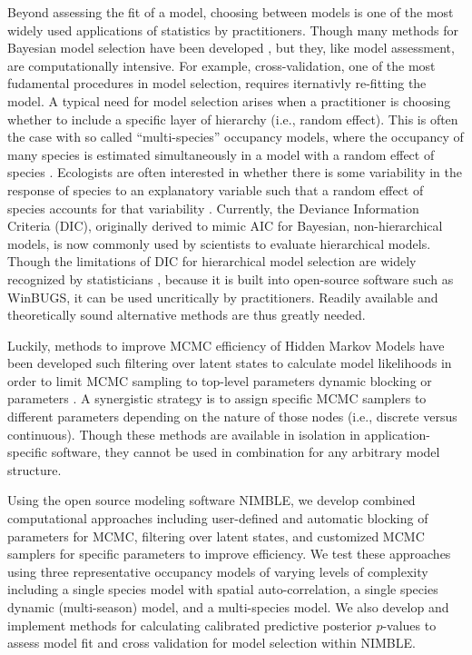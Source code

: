 \documentclass[12pt]{article}
\begin{document}
Beyond assessing the fit of a model, choosing between models is one of
the most widely used applications of statistics by
practitioners. Though many methods for Bayesian model selection have
been developed \citep{hooten2014guide}, but they, like model
assessment, are computationally intensive. For example,
cross-validation, one of the most fudamental procedures in model
selection, requires iternativly re-fitting the model. A typical need
for model selection arises when a practitioner is choosing whether to
include a specific layer of hierarchy (i.e., random effect). This is
often the case with so called ``multi-species'' occupancy models,
where the occupancy of many species is estimated simultaneously in a
model with a random effect of species \citep[reviewed in,
][]{iknayan2014detecting}. Ecologists are often interested in whether
there is some variability in the response of species to an explanatory
variable such that a random effect of species accounts for that
variability \citep{pacifici2014guidelines}. Currently, the Deviance
Information Criteria (DIC), originally derived to mimic AIC for
Bayesian, non-hierarchical models, is now commonly used by scientists
to evaluate hierarchical models. Though the limitations of DIC for
hierarchical model selection are widely recognized by statisticians
\citep{celeux2006deviance, hooten2014guide}, because it is built into
open-source software such as WinBUGS, it can be used uncritically by
practitioners. Readily available and theoretically sound alternative
methods are thus greatly needed.

Luckily, methods to improve MCMC efficiency of Hidden Markov Models
have been developed such filtering over latent states to calculate
model likelihoods in order to limit MCMC sampling to top-level
parameters dynamic blocking or parameters
\citep{turek2016efficient}. A synergistic strategy is to assign
specific MCMC samplers to different parameters depending on the nature
of those nodes (i.e., discrete versus continuous). Though these
methods are available in isolation in application-specific software,
they cannot be used in combination for any arbitrary model structure.

Using the open source modeling software NIMBLE, we develop combined
computational approaches including user-defined and automatic blocking
of parameters for MCMC, filtering over latent states, and customized
MCMC samplers for specific parameters to improve efficiency. We test
these approaches using three representative occupancy models of
varying levels of complexity including a single species model with
spatial auto-correlation, a single species dynamic (multi-season)
model, and a multi-species model. We also develop and implement
methods for calculating calibrated predictive posterior $p$-values to
assess model fit and cross validation for model selection within
NIMBLE. 
\end{document}

